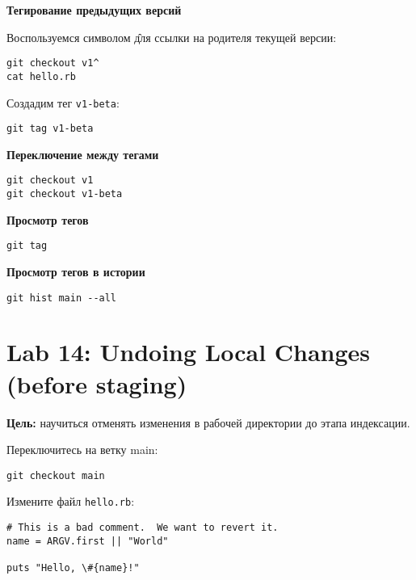 \documentclass[a4paper,12pt]{report}
\begin{document}
\textbf{Тегирование предыдущих версий}

Воспользуемся символом \^ для ссылки на родителя текущей версии:
\begin{verbatim}
git checkout v1^
cat hello.rb
\end{verbatim}


Создадим тег \texttt{v1-beta}:
\begin{verbatim}
git tag v1-beta
\end{verbatim}

\textbf{Переключение между тегами}
\begin{verbatim}
git checkout v1
git checkout v1-beta
\end{verbatim}


\textbf{Просмотр тегов}
\begin{verbatim}
git tag
\end{verbatim}

\textbf{Просмотр тегов в истории}
\begin{verbatim}
git hist main --all
\end{verbatim}


\section{Lab 14: Undoing Local Changes (before staging)}
\textbf{Цель:} научиться отменять изменения в рабочей директории до этапа индексации.

Переключитесь на ветку main:
\begin{verbatim}
git checkout main
\end{verbatim}

Измените файл \texttt{hello.rb}:
\begin{verbatim}
# This is a bad comment.  We want to revert it.
name = ARGV.first || "World"

puts "Hello, \#{name}!"
\end{verbatim}
\end{document}
